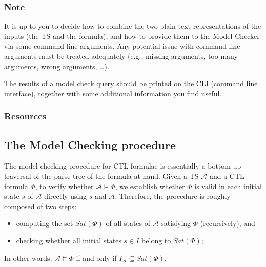 \documentclass{article}
\begin{document}
\subsubsection*{Note}
It is up to you to decide how to combine the two plain text representations of the inputs (the TS and the formula), 
and how to provide them to the Model Checker via some command-line arguments. 
Any potential issue with command line arguments must be treated adequately (e.g., missing arguments, too many arguments, wrong arguments, \dots).

The results of a model check query should be printed on the CLI (command line interface), 
together with some additional information you find useful.

\subsubsection*{Resources}
\cite[Paragraph 6.2 (in particular 6.1.1 and 6.1.2)]{BaKa}

\subsection{The Model Checking procedure}
\label{subsec:mc}
The model checking procedure for CTL formulae is essentially a bottom-up traversal of the parse tree of the formula at hand. 
Given a TS $\mathcal{A}$ and a CTL formula $\Phi$, to verify whether $\mathcal{A} \vDash \Phi$, 
we establish whether $\Phi$ is valid in each initial state $s$ of $\mathcal{A}$ directly using $s$ and $\mathcal{A}$. 
Therefore, the procedure is roughly composed of two steps: 
\begin{itemize}
    \item computing the set $Sat(\Phi)$ of all states of $\mathcal{A}$ satisfying $\Phi$ (recursively), and
    \item checking whether all initial states $s \in I$ belong to $Sat(\Phi)$; 
\end{itemize}
In other words, $\mathcal{A} \vDash \Phi$ if and only if $I_{\mathcal{A}} \subseteq Sat(\Phi)$.
\end{document}
